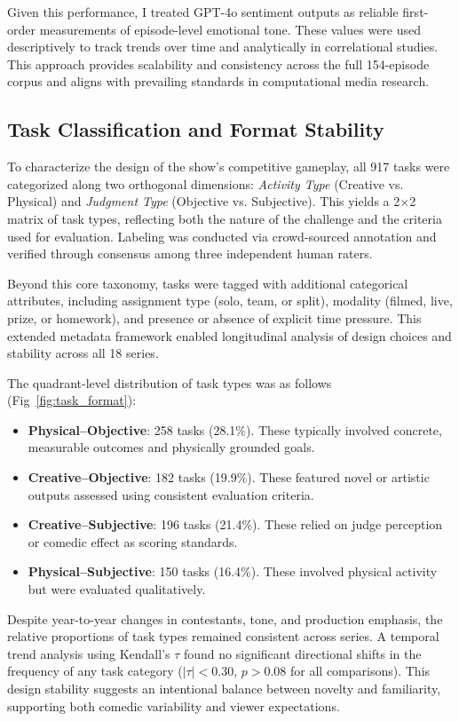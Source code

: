 \documentclass[10pt,letterpaper]{article}
\begin{document}
Given this performance, I treated GPT-4o sentiment outputs as reliable first-order measurements of episode-level emotional tone. These values were used descriptively to track trends over time and analytically in correlational studies. This approach provides scalability and consistency across the full 154-episode corpus and aligns with prevailing standards in computational media research.

\subsection*{Task Classification and Format Stability}

To characterize the design of the show’s competitive gameplay, all 917 tasks were categorized along two orthogonal dimensions: \textit{Activity Type} (Creative vs. Physical) and \textit{Judgment Type} (Objective vs. Subjective). This yields a 2×2 matrix of task types, reflecting both the nature of the challenge and the criteria used for evaluation. Labeling was conducted via crowd-sourced annotation and verified through consensus among three independent human raters.

Beyond this core taxonomy, tasks were tagged with additional categorical attributes, including assignment type (solo, team, or split), modality (filmed, live, prize, or homework), and presence or absence of explicit time pressure. This extended metadata framework enabled longitudinal analysis of design choices and stability across all 18 series.

The quadrant-level distribution of task types was as follows (Fig~\ref{fig:task_format}):
\begin{itemize}
  \item \textbf{Physical–Objective}: 258 tasks (28.1\%). These typically involved concrete, measurable outcomes and physically grounded goals.
  \item \textbf{Creative–Objective}: 182 tasks (19.9\%). These featured novel or artistic outputs assessed using consistent evaluation criteria.
  \item \textbf{Creative–Subjective}: 196 tasks (21.4\%). These relied on judge perception or comedic effect as scoring standards.
  \item \textbf{Physical–Subjective}: 150 tasks (16.4\%). These involved physical activity but were evaluated qualitatively.
\end{itemize}

Despite year-to-year changes in contestants, tone, and production emphasis, the relative proportions of task types remained consistent across series. A temporal trend analysis using Kendall’s $\tau$ found no significant directional shifts in the frequency of any task category ($|\tau| < 0.30$, $p > 0.08$ for all comparisons). This design stability suggests an intentional balance between novelty and familiarity, supporting both comedic variability and viewer expectations.
\end{document}
